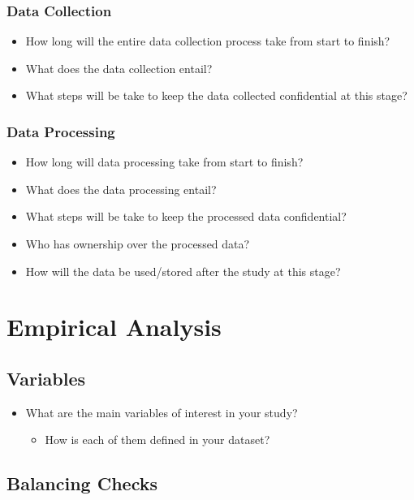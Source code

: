 \documentclass[12pt]{article}
\begin{document}
\subsubsection{Data Collection}

\begin{itemize}
\item How long will the entire data collection process take from start to finish?
\item What does the data collection entail? 
\item What steps will be take to keep the data collected confidential at this stage?
\end{itemize}

\subsubsection{Data Processing}

\begin{itemize}
\item How long will data processing take from start to finish?
\item What does the data processing entail? 
\item What steps will be take to keep the processed data confidential?
\item Who has ownership over the processed data?
\item How will the data be used/stored after the study at this stage?
\end{itemize}

\section{Empirical Analysis}

\subsection{Variables}

\begin{itemize}
\item What are the main variables of interest in your study?
\begin{itemize}
\item How is each of them defined in your dataset?
\end{itemize}
\end{itemize}

\subsection{Balancing Checks}
\end{document}
